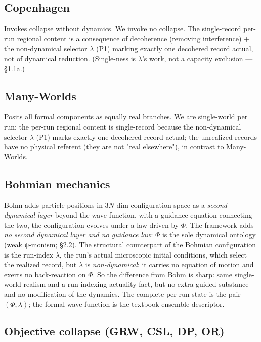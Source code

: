\documentclass[11pt,a4paper]{article}
\begin{document}
\subsection{Copenhagen}

Invokes collapse without dynamics. We invoke no collapse. The single-record per-run regional content is a consequence of decoherence (removing interference) + the non-dynamical selector $\lambda$ (P1) marking exactly one decohered record actual, not of dynamical reduction. (Single-ness is $\lambda$'s work, not a capacity exclusion — §1.1a.)

\subsection{Many-Worlds}

Posits all formal components as equally real branches. We are single-world per run: the per-run regional content is single-record because the non-dynamical selector $\lambda$ (P1) marks exactly one decohered record actual; the unrealized records have no physical referent (they are not "real elsewhere"), in contrast to Many-Worlds.

\subsection{Bohmian mechanics}

Bohm adds particle positions in $3N$-dim configuration space as a \emph{second dynamical layer} beyond the wave function, with a guidance equation connecting the two, the configuration evolves under a law driven by $\Phi$. The framework adds \emph{no second dynamical layer and no guidance law}: $\Phi$ is the sole dynamical ontology (weak ψ-monism; §2.2). The structural counterpart of the Bohmian configuration is the run-index $\lambda$, the run's actual microscopic initial conditions, which select the realized record, but $\lambda$ is \emph{non-dynamical}: it carries no equation of motion and exerts no back-reaction on $\Phi$. So the difference from Bohm is sharp: same single-world realism and a run-indexing actuality fact, but no extra guided substance and no modification of the dynamics. The complete per-run state is the pair $(\Phi, \lambda)$; the formal wave function is the textbook ensemble descriptor.

\subsection{Objective collapse (GRW, CSL, DP, OR)}
\end{document}
